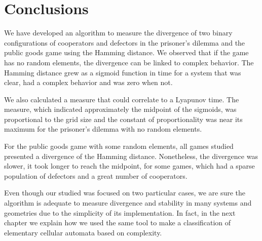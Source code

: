 \section{Conclusions}

We have developed an algorithm to measure the divergence of two binary configurations of cooperators and defectors in the prisoner's dilemma and the public goods game using the Hamming distance. We observed that if the game has no random elements, the divergence can be linked to complex behavior.
The Hamming distance grew as a sigmoid function in time for a system that was clear, had a complex behavior and was zero when not.
 
We also calculated a measure that could correlate to a Lyapunov time. The measure, which indicated approximately the midpoint of the sigmoids, was proportional to the grid size and the constant of proportionality was near its maximum for the prisoner's dilemma with no random elements.

For the public goods game with some random elements, all games studied presented a divergence of the Hamming distance. Nonetheless, the divergence was slower, it took longer to reach the midpoint, for some games, which had a sparse population of defectors and a great number of cooperators.

Even though our studied was focused on two particular cases, we are sure the algorithm is adequate to measure divergence and stability in many systems and geometries due to the simplicity of its implementation. In fact, in the next chapter we explain how we used the same tool to make a classification of elementary cellular automata based on complexity.

 




